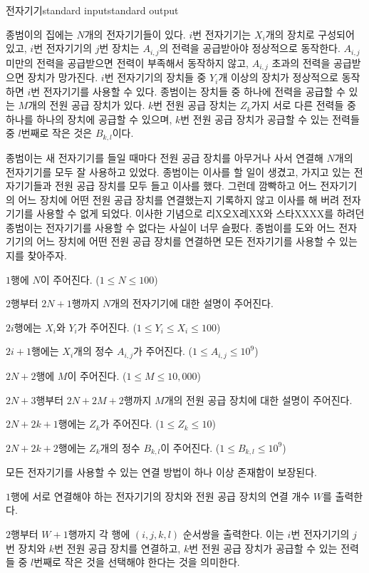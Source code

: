 \begin{problem}{전자기기}{standard input}{standard output}

종범이의 집에는 $N$개의 전자기기들이 있다. $i$번 전자기기는 $X_i$개의 장치로 구성되어 있고, $i$번 전자기기의 $j$번 장치는 $A_{i,j}$의 전력을 공급받아야 정상적으로 동작한다. $A_{i,j}$ 미만의 전력을 공급받으면 전력이 부족해서 동작하지 않고, $A_{i,j}$ 초과의 전력을 공급받으면 장치가 망가진다. $i$번 전자기기의 장치들 중 $Y_i$개 이상의 장치가 정상적으로 동작하면 $i$번 전자기기를 사용할 수 있다. 종범이는 장치들 중 하나에 전력을 공급할 수 있는 $M$개의 전원 공급 장치가 있다. $k$번 전원 공급 장치는 $Z_k$가지 서로 다른 전력들 중 하나를 하나의 장치에 공급할 수 있으며, $k$번 전원 공급 장치가 공급할 수 있는 전력들 중 $l$번째로 작은 것은 $B_{k,l}$이다.

종범이는 새 전자기기를 들일 때마다 전원 공급 장치를 아무거나 사서 연결해 $N$개의 전자기기를 모두 잘 사용하고 있었다. 종범이는 이사를 할 일이 생겼고, 가지고 있는 전자기기들과 전원 공급 장치를 모두 들고 이사를 했다. 그런데 깜빡하고 어느 전자기기의 어느 장치에 어떤 전원 공급 장치를 연결했는지 기록하지 않고 이사를 해 버려 전자기기를 사용할 수 없게 되었다. 이사한 기념으로 리X오X레XX와 스타XXXX를 하려던 종범이는 전자기기를 사용할 수 없다는 사실이 너무 슬펐다. 종범이를 도와 어느 전자기기의 어느 장치에 어떤 전원 공급 장치를 연결하면 모든 전자기기를 사용할 수 있는지를 찾아주자.

\InputFile
$1$행에 $N$이 주어진다. ($1 \le N \le 100$)

$2$행부터 $2N+1$행까지 $N$개의 전자기기에 대한 설명이 주어진다.

$2i$행에는 $X_i$와 $Y_i$가 주어진다. ($1 \le Y_i \le X_i \le 100$)

$2i+1$행에는 $X_i$개의 정수 $A_{i,j}$가 주어진다. ($1 \le A_{i,j} \le 10^9$)

$2N+2$행에 $M$이 주어진다. ($1 \le M \le 10,000$)

$2N+3$행부터 $2N+2M+2$행까지 $M$개의 전원 공급 장치에 대한 설명이 주어진다.

$2N+2k+1$행에는 $Z_k$가 주어진다. ($1 \le Z_k \le 10$)

$2N+2k+2$행에는 $Z_k$개의 정수 $B_{k,l}$이 주어진다. ($1 \le B_{k,l} \le 10^9$)

모든 전자기기를 사용할 수 있는 연결 방법이 하나 이상 존재함이 보장된다.

\OutputFile
$1$행에 서로 연결해야 하는 전자기기의 장치와 전원 공급 장치의 연결 개수 $W$를 출력한다.

$2$행부터 $W+1$행까지 각 행에 $(i, j, k, l)$ 순서쌍을 출력한다. 이는 $i$번 전자기기의 $j$번 장치와 $k$번 전원 공급 장치를 연결하고, $k$번 전원 공급 장치가 공급할 수 있는 전력들 중 $l$번째로 작은 것을 선택해야 한다는 것을 의미한다.


\end{problem}
